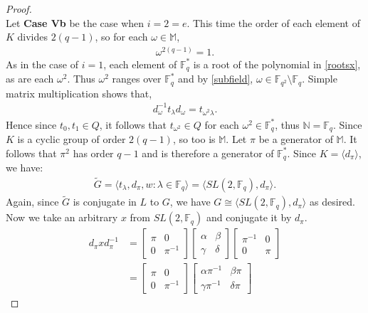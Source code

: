\begin{proof}
\\
Let \textbf{Case Vb} be the case when $i = 2 = e$. This time the order of each element of $K$ divides $2(q-1)$, so for each $\omega \in \mathbb{M}$,
\begin{align}\label{roots} \omega^{2(q-1)} = 1.
\end{align}
As in the case of $i=1$, each element of $\mathbb{F}^*_q$ is a root of the polynomial in \eqref{rootsx}, as are each $\omega^2$. Thus $\omega^2$ ranges over $\mathbb{F}^*_q$ and by \eqref{subfield}, $\omega \in \mathbb{F}_{q^2} \setminus \mathbb{F}_q$. Simple matrix multiplication shows that, \\
\begin{align*} d_\omega^{-1} t_\lambda d_\omega = t_{\omega^2 \lambda}.
\end{align*}
Hence since $t_0, t_1 \in Q$, it follows that $t_{\omega^2} \in Q$ for each $\omega^2 \in \mathbb{F}^*_q$, thus $\mathbb{N} = \mathbb{F}_q$. Since $K$ is a cyclic group of order $2(q-1)$, so too is $\mathbb{M}$. Let $\pi$ be a generator of $\mathbb{M}$. It follows that $\pi^2$ has order $q-1$ and is therefore a generator of $\mathbb{F}^*_q$. Since $K = \langle d_\pi \rangle$, we have:
\begin{align*} {\widetilde{G}} = \langle t_\lambda, d_\pi, w : \lambda \in \mathbb{F}_q \rangle = \langle SL(2,\mathbb{F}_q), d_\pi \rangle.
\end{align*}
Again, since ${\widetilde{G}}$ is conjugate in $L$ to $G$, we have $G \cong \langle SL(2,\mathbb{F}_q), d_\pi \rangle$ as desired. Now we take an arbitrary $x$ from $SL(2,\mathbb{F}_q)$ and conjugate it by $d_\pi$.
\begin{align*} d_\pi x d_\pi^{-1} &= \begin{bmatrix} \pi & 0 \\ 0 & \pi^{-1} \end{bmatrix} \begin{bmatrix} \alpha & \beta \\ \gamma & \delta \end{bmatrix}\begin{bmatrix} \pi^{-1} & 0 \\ 0 & \pi \end{bmatrix}
\\[1.5ex] &=  \begin{bmatrix} \pi & 0 \\ 0 & \pi^{-1} \end{bmatrix}  \begin{bmatrix} \alpha \pi^{-1} & \beta \pi \\ \gamma \pi^{-1} & \delta \pi \end{bmatrix}

\end{align*}
\end{proof}
